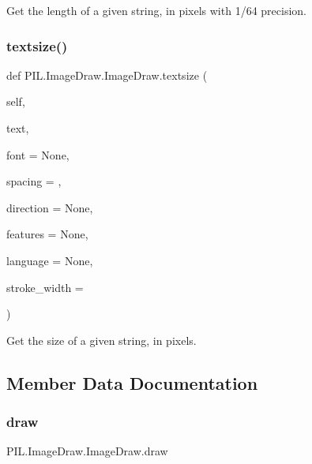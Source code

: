 \begin{DoxyVerb}Get the length of a given string, in pixels with 1/64 precision.\end{DoxyVerb}
 \mbox{\label{classPIL_1_1ImageDraw_1_1ImageDraw_a54669e83a0653b1501b9e60efdc0ee0c}} 
\subsubsection{\texorpdfstring{textsize()}{textsize()}}
{\footnotesize\ttfamily def P\+I\+L.\+Image\+Draw.\+Image\+Draw.\+textsize (\begin{DoxyParamCaption}\item[{}]{self,  }\item[{}]{text,  }\item[{}]{font = {\ttfamily None},  }\item[{}]{spacing = {},  }\item[{}]{direction = {\ttfamily None},  }\item[{}]{features = {\ttfamily None},  }\item[{}]{language = {\ttfamily None},  }\item[{}]{stroke\+\_\+width = {} }\end{DoxyParamCaption})}

\begin{DoxyVerb}Get the size of a given string, in pixels.\end{DoxyVerb}
 

\subsection{Member Data Documentation}
\mbox{\label{classPIL_1_1ImageDraw_1_1ImageDraw_ad04b4088fe06e35e7de5648b79212ffd}} 
\subsubsection{\texorpdfstring{draw}{draw}}
{\footnotesize\ttfamily P\+I\+L.\+Image\+Draw.\+Image\+Draw.\+draw}

